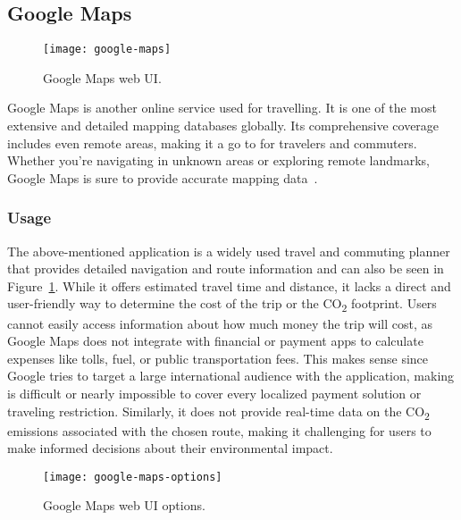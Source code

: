 \subsection{Google Maps}\label{subsec:google-maps}

\begin{figure}
    \centering
    \texttt{[image: google-maps]}
    \caption{Google Maps web UI.}
    \label{fig:figure6}
\end{figure}

Google Maps is another online service used for travelling.
It is one of the most extensive and detailed mapping databases globally.
Its comprehensive coverage includes even remote areas, making it a go to for travelers and commuters.
Whether you're navigating in unknown areas or exploring remote landmarks, Google Maps is sure to provide accurate
mapping data~\cite{googlemaps2023}.

\subsubsection{Usage}\label{subsubsec:usage}

The above-mentioned application is a widely used travel and commuting planner that provides detailed navigation and
route information and can also be seen in Figure~\ref{fig:figure6}.
While it offers estimated travel time and distance, it lacks a direct and user-friendly way to determine the cost of the
trip or the \unit{CO_{2}} footprint.
Users cannot easily access information about how much money the trip will cost, as Google Maps does not integrate with
financial or payment apps to calculate expenses like tolls, fuel, or public transportation fees.
This makes sense since Google tries to target a large international audience with the application, making is difficult
or nearly impossible to cover every localized payment solution or traveling restriction.
Similarly, it does not provide real-time data on the \unit{CO_{2}} emissions associated with the chosen route, making it
challenging for users to make informed decisions about their environmental impact.

\begin{wrapfigure}{l}{0.5\textwidth}
    \begin{center}
        \texttt{[image: google-maps-options]}
    \end{center}
    \caption{Google Maps web UI options.}
    \label{fig:figure7}
\end{wrapfigure}

